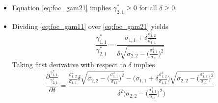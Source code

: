 \documentclass[14pt]{article}
\begin{document}
{\begin{itemize}
\item Equation \ref{eq:foc_gam21} implies $\gamma_{2,1}^* \geq 0$ for all $\delta \geq 0$.

\item Dividing \ref{eq:foc_gam11} over \ref{eq:foc_gam21} yields
$$
\frac{\gamma_{1,1}^*}{\gamma_{2,1}^*} = \frac{\sigma_{1,1} + \delta \frac{\sigma_{1,2}^2}{\sigma_{1,1}}}{\delta \sqrt{\sigma_{2,2} - \Big(\frac{\sigma_{1,1}^2}{\sigma_11}\Big)^2}} 
$$
Taking first derivative with respect to $\delta$ implies
$$
\frac{\partial \frac{\gamma_{1,1}^*}{\gamma_{2,1}^*}}{\partial \delta} = \frac{\frac{\sigma_{1,2}^2}{\sigma_{1,1}} \delta  \sqrt{\sigma_{2,2} - \Big(\frac{\sigma_{1,1}^2}{\sigma_11}\Big)^2}    - \Big( \sigma_{1,1} + \delta \frac{\sigma_{1,2}^2}{\sigma_{1,1}}  \Big)  \sqrt{\sigma_{2,2} - \Big(\frac{\sigma_{1,1}^2}{\sigma_11}\Big)^2}  }{\delta^2 \Big(   \sigma_{2,2} - \Big(\frac{\sigma_{1,1}^2}{\sigma_11}\Big)^2  \Big)}
$$ 
\end{itemize}
}
\end{document}
